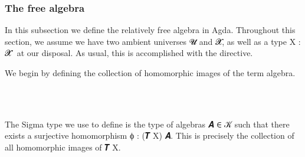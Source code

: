 \subsubsection{The free algebra}\label{the-free-algebra}
In this subsection we define the relatively free algebra in Agda. Throughout this section, we assume we have two ambient universes \ab 𝓤 and \ab 𝓧, as well as a type \ab X \as : \ab 𝓧 \af ̇ at our disposal. As usual, this is accomplished with the  directive.
\ccpad
\begin{code}%
\>[0]\AgdaSpace{}%
\AgdaSpace{}%
\AgdaSymbol{\{}\AgdaSpace{}%
\AgdaSpace{}%
\AgdaSymbol{:}\AgdaSpace{}%
\AgdaSymbol{\}\{}\AgdaSpace{}%
\AgdaSymbol{:}\AgdaSpace{}%
\AgdaSpace{}%
\AgdaSymbol{\}}\AgdaSpace{}%
\<%
\end{code}
\ccpad
We begin by defining the collection  of homomorphic images of the term algebra.
\ccpad
\begin{code}%
\>[0][@{}l@{\AgdaIndent{1}}]%
\>[1]\<%
\\
%
\>[1]\AgdaSpace{}%
\AgdaSymbol{:}\AgdaSpace{}%
\AgdaSpace{}%
\AgdaSymbol{(}\AgdaSpace{}%
\AgdaSpace{}%
\AgdaSymbol{)}\AgdaSpace{}%
\AgdaSymbol{(}\AgdaSpace{}%
\AgdaSymbol{)}\AgdaSpace{}%
\AgdaSpace{}%
\AgdaSpace{}%
\AgdaSpace{}%
\AgdaSpace{}%
\AgdaSpace{}%
\AgdaSymbol{(}\AgdaSpace{}%
\AgdaSpace{}%
\AgdaSymbol{)}\AgdaSpace{}%
\<%
\\
%
\>[1]\AgdaSpace{}%
\AgdaSpace{}%
\AgdaSymbol{=}\AgdaSpace{}%
\AgdaSpace{}%
\AgdaSpace{}%
\AgdaSpace{}%
\AgdaSymbol{(}\AgdaSpace{}%
\AgdaSpace{}%
\AgdaSymbol{)}\AgdaSpace{}%
\AgdaFunction{,}\AgdaSpace{}%
\AgdaSpace{}%
\AgdaSpace{}%
\AgdaSpace{}%
\AgdaSpace{}%
\AgdaSymbol{(}\AgdaSpace{}%
\AgdaSymbol{)}\AgdaSpace{}%
\AgdaSpace{}%
\AgdaFunction{,}\AgdaSpace{}%
\AgdaSymbol{(}\AgdaSpace{}%
\AgdaSpace{}%
\AgdaSymbol{)}\AgdaSpace{}%
\AgdaSpace{}%
\AgdaSpace{}%
\AgdaSpace{}%
\AgdaSpace{}%
\<%
\end{code}
\ccpad
The Sigma type we use to define  is the type of algebras \ab 𝑨 \af ∈ \ab 𝒦 such that there exists a surjective homomorphism \af ϕ \as :  (\af 𝑻 \ab X) \ab 𝑨. This is precisely the collection of all homomorphic images of \af 𝑻 \ab X.

